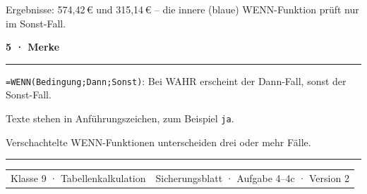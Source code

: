 \documentclass[10pt,a4paper]{article}
\newcommand{\sectiontitle}[1]{%
  \vspace{2.3mm}
  {\color{Blue}\bfseries\large #1}\par
  \vspace{0.8mm}
  {\color{Blue}\rule{\linewidth}{0.7pt}}\par
  \vspace{1.2mm}
}
\newcommand{\qd}[1]{\textquotedbl#1\textquotedbl}
\begin{document}
\vspace{1mm}
{\small Ergebnisse: 574,42\,€ und 315,14\,€ -- die innere (blaue) WENN-Funktion
prüft nur im Sonst-Fall.\par}

\sectiontitle{5 · Merke}

\begin{tcolorbox}[colback=Mint,colframe=Blue!40,arc=3mm,boxrule=0.7pt,
  left=3mm,right=3mm,top=2mm,bottom=2mm]
  \texttt{=WENN(Bedingung;Dann;Sonst)}: Bei WAHR erscheint der Dann-Fall,
  sonst der Sonst-Fall.\par
  \vspace{1.2mm}
  Texte stehen in Anführungszeichen, zum Beispiel \texttt{\qd{ja}}.\par
  \vspace{1.2mm}
  Verschachtelte WENN-Funktionen unterscheiden drei oder mehr Fälle.
\end{tcolorbox}

\vfill
{\color{Line}\rule{\linewidth}{0.5pt}}\par
\vspace{1.5mm}
\begin{tabularx}{\linewidth}{@{}Xr@{}}
  {\small\color{Muted}Klasse 9 · Tabellenkalkulation} &
  {\small\color{Muted}Sicherungsblatt · Aufgabe 4–4c · Version 2}
\end{tabularx}
\end{document}
